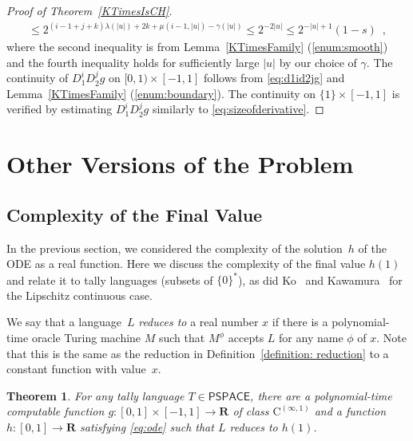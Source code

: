 \documentclass[12pt,a4paper]{article}
\newtheorem{theorem}{Theorem}%
\theoremstyle{definition}
\theoremstyle{remark}
\newcommand{\R}{\mathbf R}
\newcommand{\D}{D}
\newcommand{\classPSPACE}{\mathsf{PSPACE}}
\newcommand{\classCH}{\mathsf{CH}}
\newcommand{\classC}{\mathrm C}
\begin{document}
\begin{proof}[Proof of Theorem~\ref{KTimesIsCH}]
\begin{align}
  \le 2^{(i-1+j+k)\lambda(|u|) + 2k + \mu(i-1, |u|)  - \gamma(|u|)}
  \le 2^{-2 \lvert u \rvert}
  \le 2^{-\lvert u \rvert + 1} (1 - s) \enspace , 
  \label{eq:sizeofderivative}
 \end{align}
where the second inequality is from 
Lemma~\ref{KTimesFamily} (\ref{enum:smooth})
and the fourth inequality holds for sufficiently large $\lvert u \rvert$
by our choice of $\gamma$. 
The continuity of $\D _1 ^i \D _2 ^j g$ on $[0,1) \times [-1, 1]$ follows
from \eqref{eq:d1id2jg} and Lemma~\ref{KTimesFamily} (\ref{enum:boundary}).
The continuity on $\{1\} \times [-1, 1]$ is verified by 
estimating $\D_1^{i} \D_2^{j} g$ similarly to \eqref{eq:sizeofderivative}. 
\end{proof} 

\section{Other Versions of the Problem}

\subsection{Complexity of the Final Value}
\label{section: final value}
In the previous section, 
we considered the complexity of the solution~$h$ of the ODE as a real function. 
Here we discuss the complexity of the final value $h (1)$ and
relate it to tally languages (subsets of $\{0\}^*$), 
as did 
Ko~\cite{ko1983computational} and 
Kawamura~\cite[Theorem~5.1]{kawamura2010complexity}
for the Lipschitz continuous case.

We say that a language~$L$ \emph{reduces to} a real number $x$ 
if there is a polynomial-time oracle Turing machine $M$ 
such that $M^\phi$ accepts $L$ for any name $\phi$ of $x$.
Note that this is the same as 
the reduction in Definition~\ref{definition: reduction}
to a constant function with value~$x$. 


\begin{theorem}
\label{theorem: final value of once}
For any tally language $T \in \classPSPACE$,
there are a polynomial-time computable function
$g \colon [0,1] \times [-1,1] \to \R$ 
of class $\classC ^{(\infty, 1)}$ and 
a function $h \colon [0,1] \to \R$
satisfying \eqref{eq:ode} 
such that $L$ reduces to $h(1)$.
\end{theorem}
\end{document}

